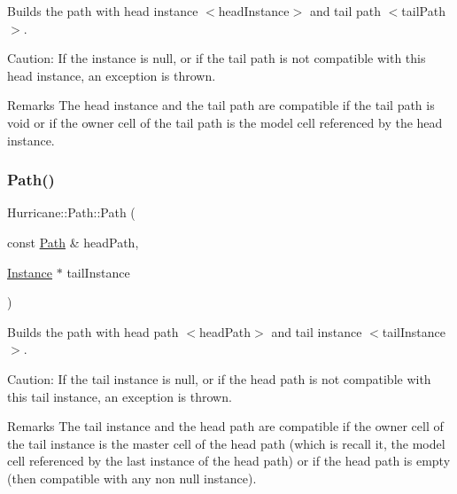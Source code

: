 Builds the path with head instance {\ttfamily $<$head\+Instance$>$} and tail path {\ttfamily $<$tail\+Path$>$}.

\begin{DoxyParagraph}{Caution\+: If the instance is null, or if the tail path is not }
compatible with this head instance, an exception is thrown.
\end{DoxyParagraph}
\begin{DoxyRemark}{Remarks}
The head instance and the tail path are compatible if the tail path is void or if the owner cell of the tail path is the model cell referenced by the head instance. 
\end{DoxyRemark}
\mbox{\label{classHurricane_1_1Path_add5812ab3bb9a4cf6dbe49d1e4e932cb}} 
\subsubsection{\texorpdfstring{Path()}{Path()}\hspace{0.1cm}{\footnotesize\ttfamily [4/6]}}
{\footnotesize\ttfamily Hurricane\+::\+Path\+::\+Path (\begin{DoxyParamCaption}\item[{const \mbox{\hyperlink{classHurricane_1_1Path}{Path}} \&}]{head\+Path,  }\item[{\mbox{\hyperlink{classHurricane_1_1Instance}{Instance}} $\ast$}]{tail\+Instance }\end{DoxyParamCaption})}

Builds the path with head path {\ttfamily $<$head\+Path$>$} and tail instance {\ttfamily $<$tail\+Instance$>$}.

\begin{DoxyParagraph}{Caution\+: If the tail instance is null, or if the head path is not }
compatible with this tail instance, an exception is thrown.
\end{DoxyParagraph}
\begin{DoxyRemark}{Remarks}
The tail instance and the head path are compatible if the owner cell of the tail instance is the master cell of the head path (which is recall it, the model cell referenced by the last instance of the head path) or if the head path is empty (then compatible with any non null instance). 
\end{DoxyRemark}
\mbox{\label{classHurricane_1_1Path_a6e3d331f5c5a0dcb91d10516a4beb6bc}} 
